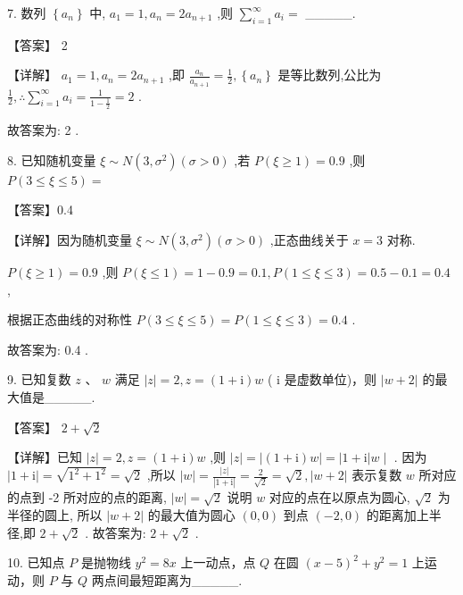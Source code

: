 \documentclass[10pt]{article}
\begin{document}
7. 数列 \(\left\{  {a}_{n}\right\}\) 中, \({a}_{1} = 1,{a}_{n} = 2{a}_{n + 1}\) ,则 \(\mathop{\sum }\limits_{{i = 1}}^{\infty }{a}_{i} =\) \_\_\_\_\_.

【答案】 2

【详解】 \({a}_{1} = 1,{a}_{n} = 2{a}_{n + 1}\) ,即 \(\frac{{a}_{n}}{{a}_{n + 1}} = \frac{1}{2},\left\{  {a}_{n}\right\}\) 是等比数列,公比为 \(\frac{1}{2},\therefore \mathop{\sum }\limits_{{i = 1}}^{\infty }{a}_{i} = \frac{1}{1 - \frac{1}{2}} = 2\) .

故答案为: 2 .

8. 已知随机变量 \(\xi  \sim  N\left( {3,{\sigma }^{2}}\right) \left( {\sigma  > 0}\right)\) ,若 \(P\left( {\xi  \geq  1}\right)  = {0.9}\) ,则 \(P\left( {3 \leq  \xi  \leq  5}\right)  =\)

【答案】0.4

【详解】因为随机变量 \(\xi  \sim  N\left( {3,{\sigma }^{2}}\right) \left( {\sigma  > 0}\right)\) ,正态曲线关于 \(x = 3\) 对称.

\(P\left( {\xi  \geq  1}\right)  = {0.9}\) ,则 \(P\left( {\xi  \leq  1}\right)  = 1 - {0.9} = {0.1},P\left( {1 \leq  \xi  \leq  3}\right)  = {0.5} - {0.1} = {0.4}\) ,

根据正态曲线的对称性 \(P\left( {3 \leq  \xi  \leq  5}\right)  = P\left( {1 \leq  \xi  \leq  3}\right)  = {0.4}\) .

故答案为: 0.4 .

9. 已知复数 \(z\) 、 \(w\) 满足 \(\left| z\right|  = 2,z = \left( {1 + \mathrm{i}}\right) w\) ( \(\mathrm{i}\) 是虚数单位)，则 \(\left| {w + 2}\right|\) 的最大值是\_\_\_\_\_.

【答案】 \(2 + \sqrt{2}\)

【详解】已知 \(\left| z\right|  = 2,z = \left( {1 + \mathrm{i}}\right) w\) ,则 \(\left| z\right|  = \left| {\left( {1 + \mathrm{i}}\right) w}\right|  = \left| {1 + \mathrm{i}}\right| w \mid\) . 因为 \(\left| {1 + \mathrm{i}}\right|  = \sqrt{{1}^{2} + {1}^{2}} = \sqrt{2}\) ,所以 \(\left| w\right|  = \frac{\left| z\right| }{\left| 1 + \mathrm{i}\right| } = \frac{2}{\sqrt{2}} = \sqrt{2},\left| {w + 2}\right|\) 表示复数 \(w\) 所对应的点到 -2 所对应的点的距离, \(\left| w\right|  = \sqrt{2}\) 说明 \(w\) 对应的点在以原点为圆心, \(\sqrt{2}\) 为半径的圆上, 所以 \(\left| {w + 2}\right|\) 的最大值为圆心 \(\left( {0,0}\right)\) 到点 \(\left( {-2,0}\right)\) 的距离加上半径,即 \(2 + \sqrt{2}\) . 故答案为: \(2 + \sqrt{2}\) .

10. 已知点 \(P\) 是抛物线 \({y}^{2} = {8x}\) 上一动点，点 \(Q\) 在圆 \({\left( x - 5\right) }^{2} + {y}^{2} = 1\) 上运动，则 \(P\) 与 \(Q\) 两点间最短距离为\_\_\_\_\_.
\end{document}

